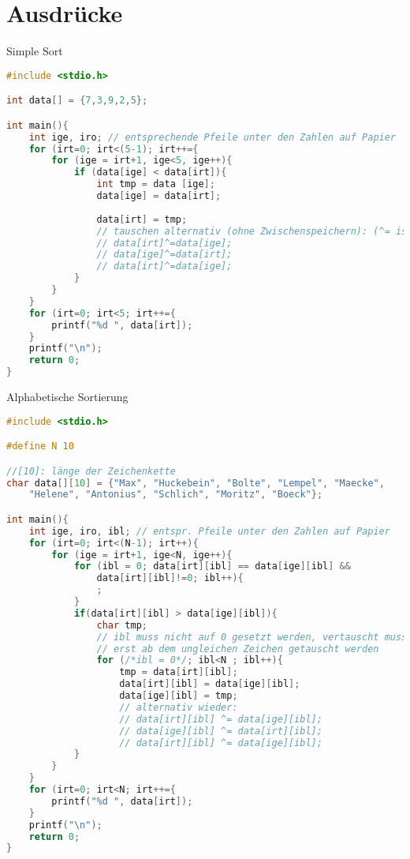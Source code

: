 \chapter{Ausdrücke}

Simple Sort

\begin{lstlisting}[language=C]
#include <stdio.h>

int data[] = {7,3,9,2,5};

int main(){
	int ige, iro; // entsprechende Pfeile unter den Zahlen auf Papier
	for (irt=0; irt<(5-1); irt++={
		for (ige = irt+1, ige<5, ige++){
			if (data[ige] < data[irt]){
				int tmp = data [ige];
				data[ige] = data[irt];
				
				data[irt] = tmp;
				// tauschen alternativ (ohne Zwischenspeichern): (^= ist XOR)
				// data[irt]^=data[ige];
				// data[ige]^=data[irt];
				// data[irt]^=data[ige];
			}
		}	
	}
	for (irt=0; irt<5; irt++={
		printf("%d ", data[irt]);
	}
	printf("\n");
	return 0;
}
\end{lstlisting}

Alphabetische Sortierung

\begin{lstlisting}[language=C]
#include <stdio.h>

#define N 10

//[10]: länge der Zeichenkette
char data[][10] = {"Max", "Huckebein", "Bolte", "Lempel", "Maecke", 
	"Helene", "Antonius", "Schlich", "Moritz", "Boeck"};

int main(){
	int ige, iro, ibl; // entspr. Pfeile unter den Zahlen auf Papier
	for (irt=0; irt<(N-1); irt++){
		for (ige = irt+1, ige<N, ige++){
			for (ibl = 0; data[irt][ibl] == data[ige][ibl] && 
				data[irt][ibl]!=0; ibl++){
				;
			}
			if(data[irt][ibl] > data[ige][ibl]){
				char tmp;
				// ibl muss nicht auf 0 gesetzt werden, vertauscht muss sowieso
				// erst ab dem ungleichen Zeichen getauscht werden
				for (/*ibl = 0*/; ibl<N ; ibl++){
					tmp = data[irt][ibl];
					data[irt][ibl] = data[ige][ibl];
					data[ige][ibl] = tmp;
					// alternativ wieder:
					// data[irt][ibl] ^= data[ige][ibl];
					// data[ige][ibl] ^= data[irt][ibl];
					// data[irt][ibl] ^= data[ige][ibl];
			}
		}	
	}
	for (irt=0; irt<N; irt++={
		printf("%d ", data[irt]);
	}
	printf("\n");
	return 0;
}
\end{lstlisting}

